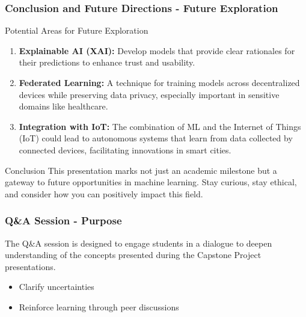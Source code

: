 \documentclass[aspectratio=169]{beamer}
\begin{document}
\begin{frame}[fragile]
    \frametitle{Conclusion and Future Directions - Future Exploration}
    \begin{block}{Potential Areas for Future Exploration}
        \begin{enumerate}
            \item \textbf{Explainable AI (XAI):}
                Develop models that provide clear rationales for their predictions to enhance trust and usability.
            \item \textbf{Federated Learning:}
                A technique for training models across decentralized devices while preserving data privacy, especially important in sensitive domains like healthcare.
            \item \textbf{Integration with IoT:}
                The combination of ML and the Internet of Things (IoT) could lead to autonomous systems that learn from data collected by connected devices, facilitating innovations in smart cities.
        \end{enumerate}
    \end{block}
    
    \begin{block}{Conclusion}
        This presentation marks not just an academic milestone but a gateway to future opportunities in machine learning. Stay curious, stay ethical, and consider how you can positively impact this field.
    \end{block}

\end{frame}

\begin{frame}[fragile]
  \frametitle{Q\&A Session - Purpose}
  The Q\&A session is designed to engage students in a dialogue to deepen understanding of the concepts presented during the Capstone Project presentations. 
  \begin{itemize}
      \item Clarify uncertainties
      \item Reinforce learning through peer discussions
  \end{itemize}
\end{frame}
\end{document}
